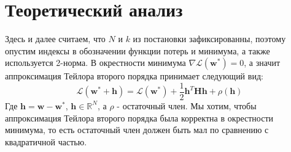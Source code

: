 \documentclass[11pt,a4paper]{article}
\begin{document}
\section{Теоретический анализ}
Здесь и далее считаем, что $N$ и $k$ из постановки зафиксированны, поэтому опустим индексы в обозначении функции потерь и минимума, а также используется 2-норма. \newline
В окрестности минимума $\nabla\mathcal{L}(\mathbf{w}^*) = 0$, а значит аппроксимация Тейлора второго порядка принимает следующий вид:
$$\mathcal{L}(\mathbf{w}^* + \mathbf{h}) = \mathcal{L}(\mathbf{w}^*)+\frac{1}{2}\mathbf{h}^T\mathbf{H}\mathbf{h}+\rho(\mathbf{h})$$
Где $\mathbf{h} = \mathbf{w} - \mathbf{w}^*$, $\mathbf{h}\in \mathbb{R}^N$, а $\rho$ - остаточный член. \newline
Мы хотим, чтобы аппроксимация Тейлора второго порядка была корректна в окрестности минимума, то есть остаточный член должен быть мал по сравнению с квадратичной частью. \newline
\end{document}

